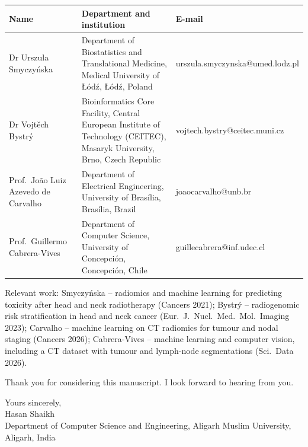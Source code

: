 \documentclass[11pt,a4paper]{article}
\begin{document}
\begin{tabularx}{\linewidth}{@{}l X l@{}}
\toprule
Name & Department and institution & E-mail \\
\midrule
Dr Urszula Smyczy\'nska & Department of Biostatistics and Translational Medicine, Medical University of \L\'od\'z, \L\'od\'z, Poland & urszula.smyczynska@umed.lodz.pl \\
Dr Vojt\v{e}ch Bystr\'y & Bioinformatics Core Facility, Central European Institute of Technology (CEITEC), Masaryk University, Brno, Czech Republic & vojtech.bystry@ceitec.muni.cz \\
Prof.\ Jo\~ao Luiz Azevedo de Carvalho & Department of Electrical Engineering, University of Bras\'ilia, Bras\'ilia, Brazil & joaocarvalho@unb.br \\
Prof.\ Guillermo Cabrera-Vives & Department of Computer Science, University of Concepci\'on, Concepci\'on, Chile & guillecabrera@inf.udec.cl \\
\bottomrule
\end{tabularx}

\smallskip
{\small Relevant work: Smyczy\'nska -- radiomics and machine learning for predicting toxicity after head and neck radiotherapy (Cancers 2021); Bystr\'y -- radiogenomic risk stratification in head and neck cancer (Eur.\ J.\ Nucl.\ Med.\ Mol.\ Imaging 2023); Carvalho -- machine learning on CT radiomics for tumour and nodal staging (Cancers 2026); Cabrera-Vives -- machine learning and computer vision, including a CT dataset with tumour and lymph-node segmentations (Sci.\ Data 2026).}

Thank you for considering this manuscript. I look forward to hearing from you.

Yours sincerely,\\[4pt]
Hasan Shaikh\\
Department of Computer Science and Engineering, Aligarh Muslim University, Aligarh, India
\end{document}
